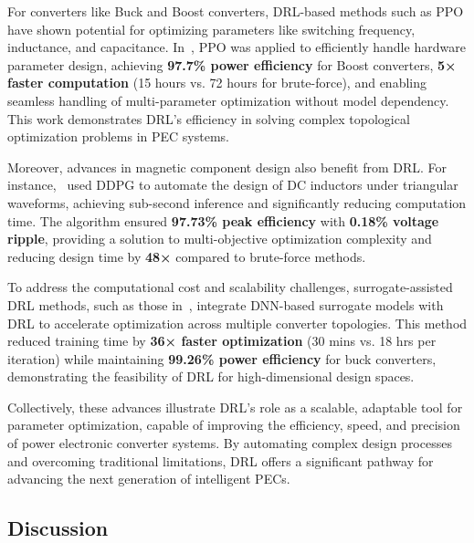 For converters like Buck and Boost converters, DRL-based methods such as PPO have shown potential for optimizing parameters like switching frequency, inductance, and capacitance. In~\cite{bui2023deep}, PPO was applied to efficiently handle hardware parameter design, achieving \textbf{97.7\% power efficiency} for Boost converters, \textbf{5× faster computation} (15 hours vs. 72 hours for brute-force), and enabling seamless handling of multi-parameter optimization without model dependency. This work demonstrates DRL's efficiency in solving complex topological optimization problems in PEC systems.

Moreover, advances in magnetic component design also benefit from DRL. For instance,~\cite{tian2022parameter, tian2024optimizing} used DDPG to automate the design of DC inductors under triangular waveforms, achieving sub-second inference and significantly reducing computation time. The algorithm ensured \textbf{97.73\% peak efficiency} with \textbf{0.18\% voltage ripple}, providing a solution to multi-objective optimization complexity and reducing design time by \textbf{48×} compared to brute-force methods.

To address the computational cost and scalability challenges, surrogate-assisted DRL methods, such as those in~\cite{bui2022deep}, integrate DNN-based surrogate models with DRL to accelerate optimization across multiple converter topologies. This method reduced training time by \textbf{36× faster optimization} (30 mins vs. 18 hrs per iteration) while maintaining \textbf{99.26\% power efficiency} for buck converters, demonstrating the feasibility of DRL for high-dimensional design spaces.

Collectively, these advances illustrate DRL's role as a scalable, adaptable tool for parameter optimization, capable of improving the efficiency, speed, and precision of power electronic converter systems. By automating complex design processes and overcoming traditional limitations, DRL offers a significant pathway for advancing the next generation of intelligent PECs.


\subsection{Discussion}
\label{sec:design_conclusion}

